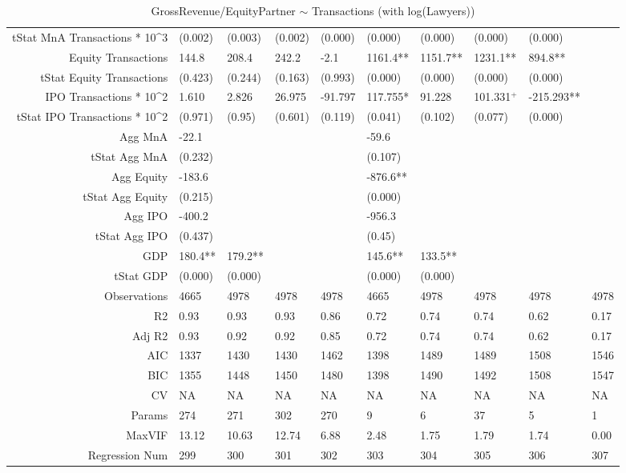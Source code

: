 \begin{table}[ht]
\begin{tabular}{rlllllllll}
  tStat MnA Transactions * 10^3 & (0.002) & (0.003) & (0.002) & (0.000) & (0.000) & (0.000) & (0.000) & (0.000) &  \\ 
  Equity Transactions & 144.8 & 208.4 & 242.2 & -2.1 & 1161.4** & 1151.7** & 1231.1** & 894.8** &  \\ 
  tStat Equity Transactions & (0.423) & (0.244) & (0.163) & (0.993) & (0.000) & (0.000) & (0.000) & (0.000) &  \\ 
  IPO Transactions * 10^2 & 1.610 & 2.826 & 26.975 & -91.797 & 117.755* & 91.228 & 101.331$^{+}$ & -215.293** &  \\ 
  tStat IPO Transactions * 10^2 & (0.971) & (0.95) & (0.601) & (0.119) & (0.041) & (0.102) & (0.077) & (0.000) &  \\ 
  Agg MnA & -22.1 &  &  &  & -59.6 &  &  &  &  \\ 
  tStat Agg MnA & (0.232) &  &  &  & (0.107) &  &  &  &  \\ 
  Agg Equity & -183.6 &  &  &  & -876.6** &  &  &  &  \\ 
  tStat Agg Equity & (0.215) &  &  &  & (0.000) &  &  &  &  \\ 
  Agg IPO & -400.2 &  &  &  & -956.3 &  &  &  &  \\ 
  tStat Agg IPO & (0.437) &  &  &  & (0.45) &  &  &  &  \\ 
  GDP & 180.4** & 179.2** &  &  & 145.6** & 133.5** &  &  &  \\ 
  tStat GDP & (0.000) & (0.000) &  &  & (0.000) & (0.000) &  &  &  \\ 
  Observations & 4665 & 4978 & 4978 & 4978 & 4665 & 4978 & 4978 & 4978 & 4978 \\ 
  R2 & 0.93 & 0.93 & 0.93 & 0.86 & 0.72 & 0.74 & 0.74 & 0.62 & 0.17 \\ 
  Adj R2 & 0.93 & 0.92 & 0.92 & 0.85 & 0.72 & 0.74 & 0.74 & 0.62 & 0.17 \\ 
  AIC & 1337 & 1430 & 1430 & 1462 & 1398 & 1489 & 1489 & 1508 & 1546 \\ 
  BIC & 1355 & 1448 & 1450 & 1480 & 1398 & 1490 & 1492 & 1508 & 1547 \\ 
  CV & NA & NA & NA & NA & NA & NA & NA & NA & NA \\ 
  Params & 274 & 271 & 302 & 270 & 9 & 6 & 37 & 5 & 1 \\ 
  MaxVIF & 13.12 & 10.63 & 12.74 & 6.88 & 2.48 & 1.75 & 1.79 & 1.74 & 0.00 \\ 
  Regression Num & 299 & 300 & 301 & 302 & 303 & 304 & 305 & 306 & 307 \\ 
   \hline
\end{tabular}
\caption{GrossRevenue/EquityPartner $\sim$ Transactions (with log(Lawyers))} 
\end{table}
